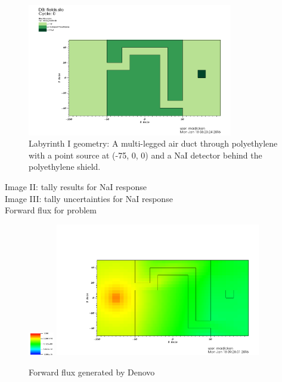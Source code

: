 \documentclass[12pt]{article}
\begin{document}
\begin{figure}
  \begin{center}
    \includegraphics[width=0.8\textwidth]{./images/geometry0000.png}
    \caption[]{\label{fig::geometry}Labyrinth I geometry: A multi-legged air duct through polyethylene with a point source at (-75, 0, 0) and a NaI detector behind the polyethylene shield.}
  \end{center}
\end{figure}

Image II: tally results for NaI response \\
Image III: tally uncertainties for NaI response \\

Forward flux for problem \\
\begin{figure}
  \begin{center}
    \includegraphics[width=0.10\textwidth]{./images/scale.png}
    \includegraphics[width=0.80\textwidth]{./images/forward_flux.png}
    \caption[]{\label{fig::fwdflux}Forward flux generated by Denovo}
  \end{center}
\end{figure}
\end{document}
